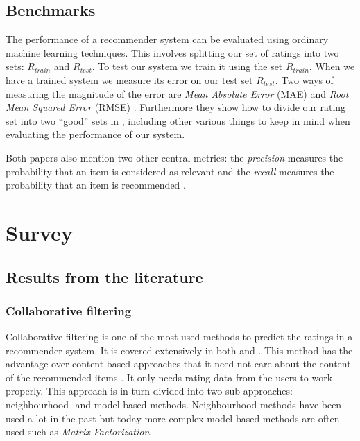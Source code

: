 \documentclass[a4paper,11pt]{article}
\begin{document}
\subsection{Benchmarks}
The performance of a recommender system can be evaluated using ordinary machine learning techniques.
This involves splitting our set of ratings into two sets: $R_{train}$ and $R_{test}$. To test our system
we train it using the set $R_{train}$. When we have a trained system we measure its error on our test set
$R_{test}$. Two ways of measuring the magnitude of the error are \emph{Mean Absolute Error} (MAE) and
\emph{Root Mean Squared Error} (RMSE) \cite{springerlink:10.1007/978-0-387-85820-3_1}.
Furthermore they show how to divide our rating set into two ``good'' sets in \cite{Herlocker:2004:ECF:963770.963772},
including other various things to keep in mind when evaluating the performance of our system.

Both papers also mention two other central metrics: the \emph{precision}
measures the probability that an item is considered as relevant and the
\emph{recall} measures the probability that an item is recommended \cite{Herlocker:2004:ECF:963770.963772}.

\section{Survey}
\subsection{Results from the literature}
\subsubsection{Collaborative filtering}
Collaborative filtering is one of the most used methods to predict the ratings in
a recommender system. It is covered extensively in both \cite{springerlink:10.1007/978-0-387-85820-3_1} and \cite{1423975}. This method has the advantage over content-based approaches that it need not care about the content of the recommended items \cite{1423975}. It only needs rating data from the users to work properly. This approach is in turn divided into two sub-approaches: neighbourhood- and model-based methods. Neighbourhood methods have been used a lot in the past but today more complex model-based methods are often used such as \emph{Matrix Factorization}.
\end{document}
